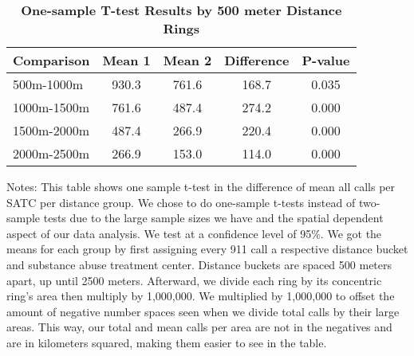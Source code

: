 \begin{table}[htbp]
\centering
\begin{tabular}{l|c c c c}
\hline
Comparison & Mean 1 & Mean 2 & Difference & P-value \\
\hline
500m-1000m & 930.3 & 761.6 & 168.7 & 0.035 \\
1000m-1500m & 761.6 & 487.4 & 274.2 & 0.000 \\
1500m-2000m & 487.4 & 266.9 & 220.4 & 0.000 \\
2000m-2500m & 266.9 & 153.0 & 114.0 & 0.000 \\
\hline
\end{tabular}
\caption{\textbf{One-sample T-test Results by 500 meter Distance Rings}}
\label{tab:ttests_500}
\centering\small{Notes: This table shows one sample t-test in the difference of mean all calls per SATC per distance group.  We chose to do one-sample t-tests instead of two-sample tests due to the large sample sizes we have and the spatial dependent aspect of our data analysis. We test at a confidence level of 95\%. We got the means for each group by first assigning every 911 call a respective distance bucket and substance abuse treatment center. Distance buckets are spaced 500 meters apart, up until 2500 meters. Afterward, we divide each ring by its concentric ring's area then multiply by 1,000,000. We multiplied by 1,000,000 to offset the amount of negative number spaces seen when we divide total calls by their large areas. This way, our total and mean calls per area are not in the negatives and are in kilometers squared, making them easier to see in the table.}
\end{table}
